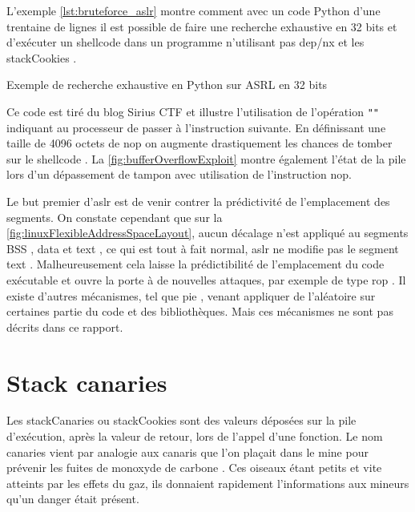 L'exemple \autoref{lst:bruteforce_aslr} montre comment avec un code Python d'une trentaine de lignes il est possible de faire une recherche exhaustive en 32 bits et d'exécuter un \og shellcode \fg dans un programme n'utilisant pas \gls{dep}/\gls{nx} et les \og \gls{stackCookies} \fg.

\begin{listing}
	\caption{Exemple de recherche exhaustive en Python sur ASRL en 32 bits}
	\label{lst:bruteforce_aslr}
\end{listing}

Ce code est tiré du blog \og Sirius CTF \fg \cite{ExploitingSimpleBufferOverflow} et illustre l'utilisation de l'opération \texttt{""} indiquant au processeur de passer à l'instruction suivante. En définissant une taille de 4096 octets de \og \gls{nop} \fg on augmente drastiquement les chances de tomber sur le \og shellcode \fg. La \autoref{fig:bufferOverflowExploit} montre également l'état de la pile lors d'un dépassement de tampon avec utilisation de l'instruction \gls{nop}.

Le but premier d'\gls{aslr} est de venir contrer la prédictivité de l'emplacement des segments. On constate cependant que sur la \autoref{fig:linuxFlexibleAddressSpaceLayout}, aucun décalage n'est appliqué au segments \og BSS \fg, \og data \fg et \og text \fg, ce qui est tout à fait normal, \gls{aslr} ne modifie pas le segment \og text \fg. Malheureusement cela laisse la prédictibilité de l'emplacement du code exécutable et ouvre la porte à de nouvelles attaques, par exemple de type \og \gls{rop} \fg. Il existe d'autres mécanismes, tel que \og \gls{pie} \fg \cite{PositionIndependentExecutables}, venant appliquer de l'aléatoire sur certaines partie du code et des bibliothèques. Mais ces mécanismes ne sont pas décrits dans ce rapport.

\vfill

\section{\og Stack canaries \fg}

Les \og \gls{stackCanaries} \fg ou \og \gls{stackCookies} \fg sont des valeurs déposées sur la pile d'exécution, après la valeur de retour, lors de l'appel d'une fonction. Le nom \og canaries \fg vient par analogie aux canaris que l'on plaçait dans le mine pour prévenir les fuites de monoxyde de carbone \cite{StackCanaries, SentinelSpecies}. Ces oiseaux étant petits et vite atteints par les effets du gaz, ils donnaient rapidement l'informations aux mineurs qu'un danger était présent.

